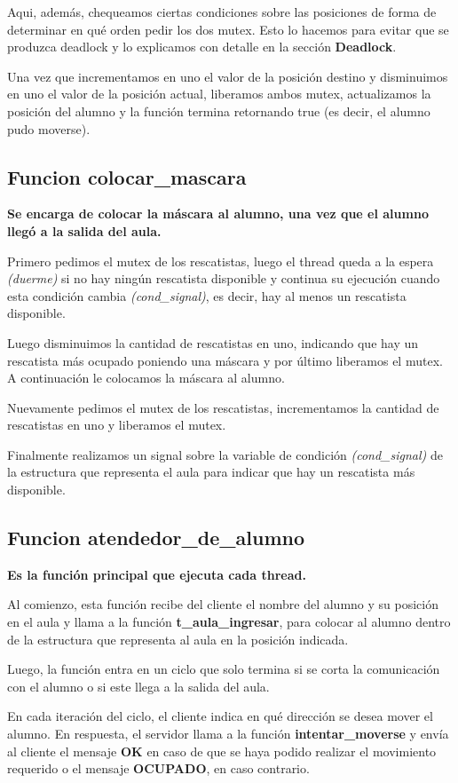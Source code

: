Aqui, además, chequeamos ciertas condiciones sobre las posiciones de forma de determinar en qué orden pedir los dos mutex. Esto lo hacemos para evitar que se produzca deadlock y lo explicamos con detalle en la sección \textbf{Deadlock}.

Una vez que incrementamos en uno el valor de la posición destino y disminuimos en uno el valor de la posición actual, liberamos ambos mutex, actualizamos la posición del alumno y la función termina retornando true (es decir, el alumno pudo moverse).

\subsection{Funcion colocar\_mascara}
\textbf{Se encarga de colocar la máscara al alumno, una vez que el alumno llegó a la salida del aula.}

Primero pedimos el mutex de los rescatistas, luego el thread queda a la espera \textit{(duerme)} si no hay ningún rescatista disponible y continua su ejecución cuando esta condición cambia \textit{(cond\_signal)}, es decir, hay al menos un rescatista disponible.

Luego disminuimos la cantidad de rescatistas en uno, indicando que hay un rescatista más ocupado poniendo una máscara y por último liberamos el mutex.
A continuación le colocamos la máscara al alumno.

Nuevamente pedimos el mutex de los rescatistas, incrementamos la cantidad de rescatistas en uno y liberamos el mutex.

Finalmente realizamos un signal sobre la variable de condición \textit{(cond\_signal)} de la estructura que representa el aula para indicar que hay un rescatista más disponible.

\subsection{Funcion atendedor\_de\_alumno}
\textbf{Es la función principal que ejecuta cada thread.}

Al comienzo, esta función recibe del cliente el nombre del alumno y su posición en el aula y llama a la función \textbf{t\_aula\_ingresar}, para colocar al alumno dentro de la estructura que representa al aula en la posición indicada.

Luego, la función entra en un ciclo que solo termina si se corta la comunicación con el alumno o si este llega a la salida del aula.

En cada iteración del ciclo, el cliente indica en qué dirección se desea mover el alumno. En respuesta, el servidor llama a la función \textbf{intentar\_moverse} y envía al cliente el mensaje \textbf{OK} en caso de que se haya podido realizar el movimiento requerido o el mensaje \textbf{OCUPADO}, en caso contrario.

